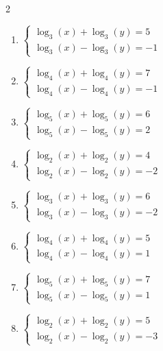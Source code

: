 \documentclass[12pt,a4paper]{article}
\begin{document}
\begin{multicols}{2}
\begin{enumerate}[leftmargin=*, itemsep=6pt]

\item \(\begin{cases} \log_{3}\left(x\right)+\log_{3}\left(y\right)=5\\ \log_{3}\left(x\right)-\log_{3}\left(y\right)=-1\end{cases}\)

\item \(\begin{cases} \log_{4}\left(x\right)+\log_{4}\left(y\right)=7\\ \log_{4}\left(x\right)-\log_{4}\left(y\right)=-1\end{cases}\)

\item \(\begin{cases} \log_{5}\left(x\right)+\log_{5}\left(y\right)=6\\ \log_{5}\left(x\right)-\log_{5}\left(y\right)=2\end{cases}\)

\item \(\begin{cases} \log_{2}\left(x\right)+\log_{2}\left(y\right)=4\\ \log_{2}\left(x\right)-\log_{2}\left(y\right)=-2\end{cases}\)

\item \(\begin{cases} \log_{3}\left(x\right)+\log_{3}\left(y\right)=6\\ \log_{3}\left(x\right)-\log_{3}\left(y\right)=-2\end{cases}\)

\item \(\begin{cases} \log_{4}\left(x\right)+\log_{4}\left(y\right)=5\\ \log_{4}\left(x\right)-\log_{4}\left(y\right)=1\end{cases}\)

\item \(\begin{cases} \log_{5}\left(x\right)+\log_{5}\left(y\right)=7\\ \log_{5}\left(x\right)-\log_{5}\left(y\right)=1\end{cases}\)

\item \(\begin{cases} \log_{2}\left(x\right)+\log_{2}\left(y\right)=5\\ \log_{2}\left(x\right)-\log_{2}\left(y\right)=-3\end{cases}\)


\end{enumerate}
\end{multicols}
\end{document}
